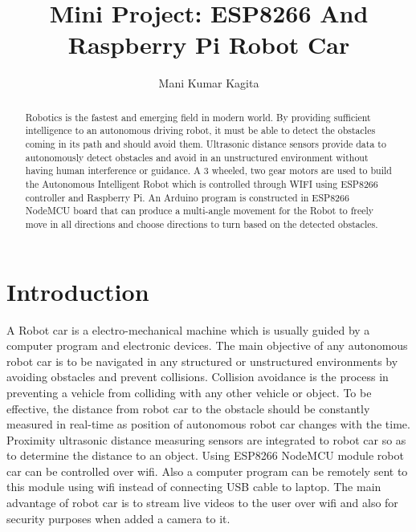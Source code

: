 \documentclass[sigconf]{acmart}
\begin{document}
\title{Mini Project: ESP8266 And Raspberry Pi Robot Car}

\author{Mani Kumar Kagita}


\begin{abstract}
Robotics is the fastest and emerging field in modern world. By providing sufficient intelligence to an autonomous driving robot, it must be able to detect the obstacles coming in its path and should avoid them. Ultrasonic distance sensors provide data to autonomously detect obstacles and avoid in an unstructured environment without having human interference or guidance. A 3 wheeled, two gear motors are used to build the Autonomous Intelligent Robot which is controlled through WIFI using ESP8266 controller and Raspberry Pi. An Arduino program is constructed in ESP8266 NodeMCU board that can produce a multi-angle movement for the Robot to freely move in all directions and choose directions to turn based on the detected obstacles. 

\end{abstract}


\maketitle

\section{Introduction}
A Robot car is a electro-mechanical machine which is usually guided by a computer program and electronic devices. The main objective of any autonomous robot car is to be navigated in any structured or unstructured environments by avoiding obstacles and prevent collisions. 
Collision avoidance is the process in preventing a vehicle from colliding with any other vehicle or object. 
To be effective, the distance from robot car to the obstacle should be constantly measured in real-time as position of autonomous robot car changes with the time.
Proximity ultrasonic distance measuring sensors are integrated to robot car so as to determine the distance to an object. Using ESP8266 NodeMCU module robot car can be controlled over wifi. Also a computer program can be remotely sent to this module using wifi instead of connecting USB cable to laptop. The main advantage of robot car is to stream live videos to the user over wifi and also for security purposes when added a camera to it.
\end{document}
